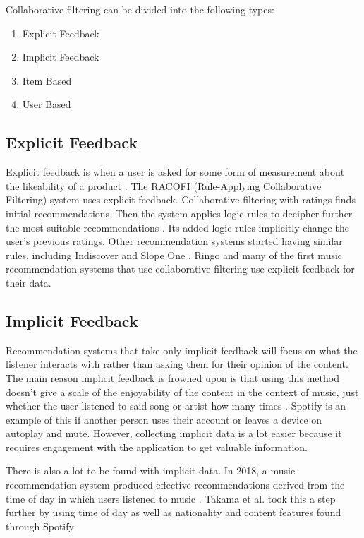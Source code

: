 Collaborative filtering can be divided into the following types:

\begin{enumerate}
	\item Explicit Feedback
	\item Implicit Feedback
	\item Item Based
	\item User Based
\end{enumerate}




\subsection{Explicit Feedback}

Explicit feedback is when a user is asked for some form of measurement about the likeability of a product \citep{celma_recommendation_2010}. The RACOFI (Rule-Applying Collaborative Filtering) system uses explicit feedback. Collaborative filtering with ratings finds initial recommendations. Then the system applies logic rules to decipher further the most suitable recommendations \citep{anderson_racofi_2003}. Its added logic rules implicitly change the user's previous ratings. Other recommendation systems started having similar rules, including Indiscover and Slope One \citep{celma_music_2010, lemire_slope_2007}. Ringo and many of the first music recommendation systems that use collaborative filtering use explicit feedback for their data. 

\subsection{Implicit Feedback}

Recommendation systems that take only implicit feedback will focus on what the listener interacts with rather than asking them for their opinion of the content. The main reason implicit feedback is frowned upon is that using this method doesn't give a scale of the enjoyability of the content in the context of music, just whether the user listened to said song or artist how many times \citep{celma_recommendation_2010}. Spotify is an example of this if another person uses their account or leaves a device on autoplay and mute. However, collecting implicit data is a lot easier because it requires engagement with the application to get valuable information. 

There is also a lot to be found with implicit data. In 2018, a music recommendation system produced effective recommendations derived from the time of day in which users listened to music \citep{sanchez-moreno_incorporating_2018}. Takama et al. took this a step further by using time of day as well as nationality and content features found through Spotify \citep{takama_context-aware_2021} 

